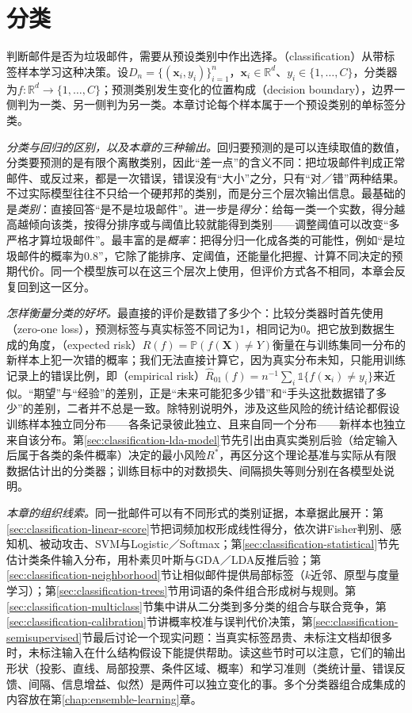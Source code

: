 \chapter{分类}
\label{chap:classification}

判断邮件是否为垃圾邮件，需要从预设类别中作出选择。（classification）从带标签样本学习这种决策。设$D_n=\{(\bm{x}_i,y_i)\}_{i=1}^{n}$，$\bm{x}_i\in\mathbb{R}^{d}$、$y_i\in\{1,\dots,C\}$，分类器为$f:\mathbb{R}^{d}\to\{1,\dots,C\}$；预测类别发生变化的位置构成（decision boundary），边界一侧判为一类、另一侧判为另一类。本章讨论每个样本属于一个预设类别的单标签分类。

\emph{分类与回归的区别，以及本章的三种输出。}回归要预测的是可以连续取值的数值，分类要预测的是有限个离散类别，因此“差一点”的含义不同：把垃圾邮件判成正常邮件、或反过来，都是一次错误，错误没有“大小”之分，只有“对／错”两种结果。不过实际模型往往不只给一个硬邦邦的类别，而是分三个层次输出信息。最基础的是\emph{类别}：直接回答“是不是垃圾邮件”。进一步是\emph{得分}：给每一类一个实数，得分越高越倾向该类，按得分排序或与阈值比较就能得到类别——调整阈值可以改变“多严格才算垃圾邮件”。最丰富的是\emph{概率}：把得分归一化成各类的可能性，例如“是垃圾邮件的概率为$0.8$”，它除了能排序、定阈值，还能量化把握、计算不同决定的预期代价。同一个模型族可以在这三个层次上使用，但评价方式各不相同，本章会反复回到这一区分。

\emph{怎样衡量分类的好坏。}最直接的评价是数错了多少个：比较分类器时首先使用（zero-one loss），预测标签与真实标签不同记为1，相同记为0。把它放到数据生成的角度，（expected risk）$R(f)=\mathbb P(f(\bm X)\ne Y)$衡量在与训练集同一分布的新样本上犯一次错的概率；我们无法直接计算它，因为真实分布未知，只能用训练记录上的错误比例，即（empirical risk）$\widehat R_{01}(f)=n^{-1}\sum_i\mathbb 1\{f(\bm x_i)\ne y_i\}$来近似。“期望”与“经验”的差别，正是“未来可能犯多少错”和“手头这批数据错了多少”的差别，二者并不总是一致。除特别说明外，涉及这些风险的统计结论都假设训练样本独立同分布——各条记录彼此独立、且来自同一个分布——新样本也独立来自该分布。第\ref{sec:classification-lda-model}节先引出由真实类别后验（给定输入后属于各类的条件概率）决定的最小风险$R^\ast$，再区分这个理论基准与实际从有限数据估计出的分类器；训练目标中的对数损失、间隔损失等则分别在各模型处说明。

\emph{本章的组织线索。}同一批邮件可以有不同形式的类别证据，本章据此展开：第\ref{sec:classification-linear-score}节把词频加权形成线性得分，依次讲Fisher判别、感知机、被动攻击、SVM与Logistic／Softmax；第\ref{sec:classification-statistical}节先估计类条件输入分布，用朴素贝叶斯与GDA／LDA反推后验；第\ref{sec:classification-neighborhood}节让相似邮件提供局部标签（$k$近邻、原型与度量学习）；第\ref{sec:classification-trees}节用词语的条件组合形成树与规则。第\ref{sec:classification-multiclass}节集中讲从二分类到多分类的组合与联合竞争，第\ref{sec:classification-calibration}节讲概率校准与误判代价决策，第\ref{sec:classification-semisupervised}节最后讨论一个现实问题：当真实标签昂贵、未标注文档却很多时，未标注输入在什么结构假设下能提供帮助。读这些节时可以注意，它们的输出形状（投影、直线、局部投票、条件区域、概率）和学习准则（类统计量、错误反馈、间隔、信息增益、似然）是两件可以独立变化的事。多个分类器组合成集成的内容放在第\ref{chap:ensemble-learning}章。

